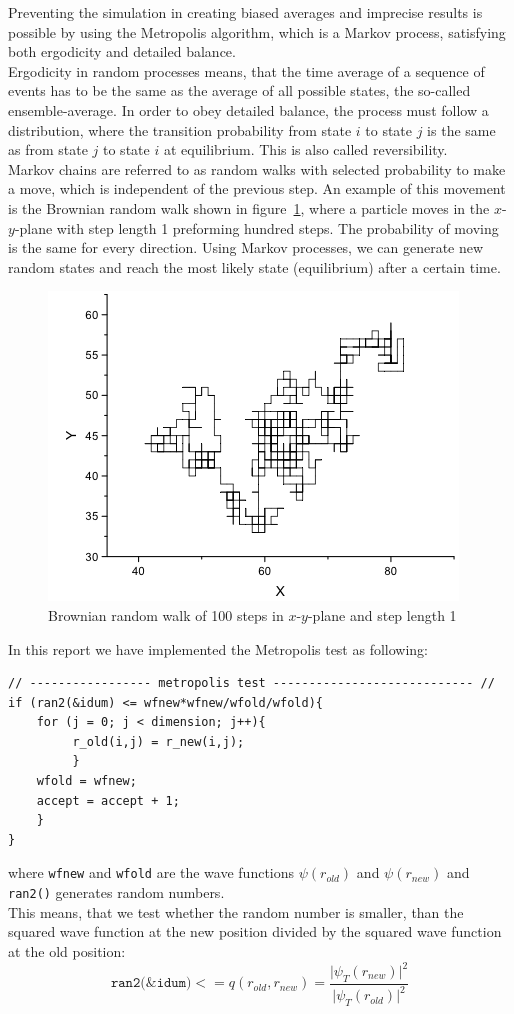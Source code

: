 \FloatBarrier
Preventing the simulation in creating biased averages and imprecise results is possible by using the Metropolis algorithm, which is a Markov process, satisfying both ergodicity and detailed balance.\\
Ergodicity in random processes means, that the time average of a sequence of events has to be the same as the average of all possible states, the so-called ensemble-average. In order to obey detailed balance, the process must follow a distribution, where the transition probability from state $i$ to state $j$ is the same as from state $j$ to state $i$ at equilibrium. This is also called reversibility.\\
Markov chains are referred to as random walks with selected probability to make a move, which is independent of the previous step. An example of this movement is the Brownian random walk shown in figure~\ref{fig:Brown}, where a particle moves in the $x$-$y$-plane with step length 1 preforming hundred steps. The probability of moving is the same for every direction. Using Markov processes, we can generate new random states and reach the most likely state (equilibrium) after a certain time.
\begin{figure}
    \centering
    \includegraphics[scale=0.45]{Brown}
    \caption{Brownian random walk of 100 steps in $x$-$y$-plane and step length 1}
    \label{fig:Brown}
\end{figure}
\FloatBarrier
In this report we have implemented the Metropolis test as following:
\begin{lstlisting}
// ----------------- metropolis test ---------------------------- //
if (ran2(&idum) <= wfnew*wfnew/wfold/wfold){
    for (j = 0; j < dimension; j++){
         r_old(i,j) = r_new(i,j);
         }
    wfold = wfnew;
    accept = accept + 1;
    }
}
\end{lstlisting}
where \texttt{wfnew} and \texttt{wfold} are the wave functions $\psi(r_{old})$ and $\psi(r_{new})$ and \texttt{ran2()} generates random numbers.\\
This means, that we test whether the random number is smaller, than the squared wave function at the new position divided by the squared wave function at the old position:
\begin{equation}
\texttt{ran2(\&idum)} <= q(r_{old},r_{new}) = \frac{\vert \psi_T(r_{new})\vert^2}{\vert \psi_T(r_{old})\vert ^2}
\end{equation}
